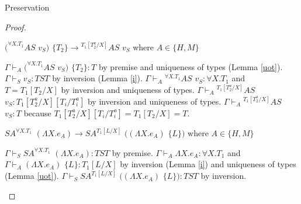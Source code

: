 \begin{theorem}{Preservation}
\begin{proof}

\begin{case}
$(^{\forall X.T_{1}}AS$ $v_{S})$ $\lbrace T_{2}\rbrace\rightarrow{^{T_{1}[T_{2}^{a}/X]}A}S$ $v_{S}$ where $A\in\lbrace H,M\rbrace$

$\Gamma\vdash_{A}(^{\forall X.T_{1}}AS$ $v_{S})$ $\lbrace T_{2}\rbrace:T$ by premise and uniqueness of types (Lemma \ref{uot}).  $\Gamma\vdash_{S}v_{S}:TST$ by inversion (Lemma \ref{i}).  $\Gamma\vdash_{A}{^{\forall X.T_{1}}A}S$ $v_{S}:\forall X.T_{1}$ and $T=T_{1}[T_{2}/X]$ by inversion and uniqueness of types.  $\Gamma\vdash_{A}{^{T_{1}[T_{2}^{a}/X]}A}S$ $v_{S}:T_{1}[T_{2}^{a}/X][T_{i}/T_{i}^{a}]$ by inversion and uniqueness of types.  $\Gamma\vdash_{A}{^{T_{1}[T_{2}^{a}/X]}A}S$ $v_{S}:T$ because $T_{1}[T_{2}^{a}/X][T_{i}/T_{i}^{a}]=T_{1}[T_{2}/X]=T$.
\end{case}


\begin{case}
$SA^{\forall X.T_{1}}$ $(\Lambda X.e_{A})\rightarrow SA^{T_{1}[L/X]}$ $((\Lambda X.e_{A})$ $\lbrace L\rbrace)$ where $A\in\lbrace H,M\rbrace$

$\Gamma\vdash_{S}SA^{\forall X.T_{1}}$ $(\Lambda X.e_{A}):TST$ by premise.  $\Gamma\vdash_{A}\Lambda X.e_{A}:\forall X.T_{1}$ and $\Gamma\vdash_{A}(\Lambda X.e_{A})$ $\lbrace L\rbrace:T_{1}[L/X]$ by inversion (Lemma \ref{i}) and uniqueness of types (Lemma \ref{uot}).  $\Gamma\vdash_{S}SA^{T_{1}[L/X]}$ $((\Lambda X.e_{A})$ $\lbrace L\rbrace):TST$ by inversion.
\end{case}

\end{proof}

\end{theorem}
